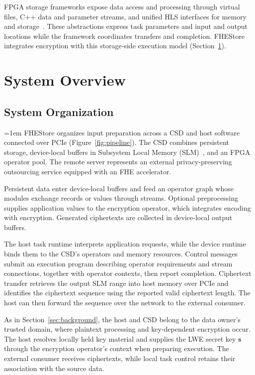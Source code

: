 \documentclass[sigconf,anonymous,balance=false]{acmart}
\newcommand{\bodypar}{\par\vskip 0pt plus 6pt\relax}
\begin{document}
FPGA storage frameworks expose data access and processing through virtual files, C++ data and parameter streams, and unified HLS interfaces for memory and storage~\cite{ruan2019insider,wong2024dongle}. These abstractions express task parameters and input and output locations while the framework coordinates transfers and completion. FHEStore integrates encryption with this storage-side execution model (Section~\ref{sec:architecture}).

\section{System Overview}
\label{sec:architecture}

\subsection{System Organization}
\label{subsec:system-organization}

\begingroup
\emergencystretch=1em
FHEStore organizes input preparation across a CSD and host software connected over PCIe (Figure~\ref{fig:pipeline}). The CSD combines persistent storage, device-local buffers in Subsystem Local Memory (SLM)~\cite{nvme2025slm}, and an FPGA operator pool. The remote server represents an external privacy-preserving outsourcing service equipped with an FHE accelerator.
\par
\endgroup
\bodypar

Persistent data enter device-local buffers and feed an operator graph whose modules exchange records or values through streams. Optional preprocessing supplies application values to the encryption operator, which integrates encoding with encryption. Generated ciphertexts are collected in device-local output buffers.
\bodypar

The host task runtime interprets application requests, while the device runtime binds them to the CSD's operators and memory resources. Control messages submit an execution program describing operator requirements and stream connections, together with operator contexts, then report completion. Ciphertext transfer retrieves the output SLM range into host memory over PCIe and identifies the ciphertext sequence using the reported valid ciphertext length. The host can then forward the sequence over the network to the external consumer.
\bodypar

As in Section~\ref{sec:background}, the host and CSD belong to the data owner's trusted domain, where plaintext processing and key-dependent encryption occur. The host resolves locally held key material and supplies the LWE secret key $\mathbf{s}$ through the encryption operator's context when preparing execution. The external consumer receives ciphertexts, while local task control retains their association with the source data.
\end{document}
